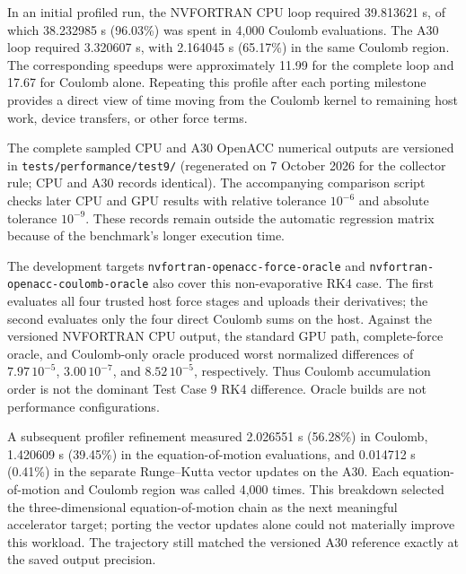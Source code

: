 In an initial profiled run, the NVFORTRAN CPU loop required 39.813621 s,
of which 38.232985 s (96.03\%) was spent in 4,000 Coulomb evaluations.
The A30 loop required 3.320607 s, with 2.164045 s (65.17\%) in the same
Coulomb region. The corresponding speedups were approximately 11.99 for the
complete loop and 17.67 for Coulomb alone. Repeating this profile after each
porting milestone provides a direct view of time moving from the Coulomb
kernel to remaining host work, device transfers, or other force terms.

The complete sampled CPU and A30 OpenACC numerical outputs are versioned in
\texttt{tests/performance/test9/} (regenerated on 7 October 2026 for the
collector rule; CPU and A30 records identical). The accompanying comparison script checks
later CPU and GPU results with relative tolerance $10^{-6}$ and absolute
tolerance $10^{-9}$. These records remain outside the automatic regression
matrix because of the benchmark's longer execution time.

The development targets \texttt{nvfortran-openacc-force-oracle} and
\texttt{nvfortran-openacc-coulomb-oracle} also cover this non-evaporative RK4
case. The first evaluates all four trusted host force stages and uploads their
derivatives; the second evaluates only the four direct Coulomb sums on the
host. Against the versioned NVFORTRAN CPU output, the standard GPU path,
complete-force oracle, and Coulomb-only oracle produced worst normalized
differences of $7.97\,10^{-5}$, $3.00\,10^{-7}$, and $8.52\,10^{-5}$,
respectively. Thus Coulomb accumulation order is not the dominant Test Case 9
RK4 difference. Oracle builds are not performance configurations.

A subsequent profiler refinement measured 2.026551 s (56.28\%) in Coulomb,
1.420609 s (39.45\%) in the equation-of-motion evaluations, and 0.014712 s
(0.41\%) in the separate Runge--Kutta vector updates on the A30. Each
equation-of-motion and Coulomb region was called 4,000 times. This breakdown
selected the three-dimensional equation-of-motion chain as the next meaningful
accelerator target; porting the vector updates alone could not materially improve
this workload. The trajectory still matched the versioned A30 reference
exactly at the saved output precision.

